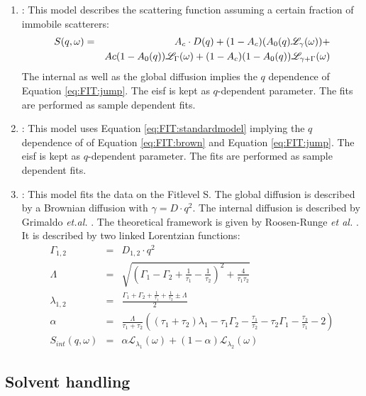 \begin{enumerate}
	\item {}: This model describes the scattering function assuming a certain fraction of immobile scatterers:
		\begin{eqnarray}
		S(q,\omega)&=&A_c\cdot D(q) +(1-A_c)(A_0(q)\mathscr{L}_\gamma(\omega))+\notag\\
		&&Ac(1-A_0(q))\mathscr{L}_{\Gamma}(\omega)+(1-A_c)(1-A_0(q))\mathscr{L}_{\gamma+\Gamma}(\omega)\label{eq:FIT:crystalmodel}
		\end{eqnarray}
	The internal as well as the global diffusion implies the $q$ dependence of Equation \ref{eq:FIT:jump}. The \gls{eisf} is kept as $q$-dependent parameter. The fits are performed as sample dependent fits.  \cite{Beck_2019_CrystGrowthDes}
	\item {}: This model uses Equation \ref{eq:FIT:standardmodel} implying the $q$ dependence of of Equation \ref{eq:FIT:brown} and Equation \ref{eq:FIT:jump}. The \gls{eisf} is kept as $q$-dependent parameter. The fits are performed as sample dependent fits. 
	\item {}: This model fits the data on the Fitlevel S. The global diffusion is described by a Brownian diffusion with $\gamma=D\cdot q^2$. The internal diffusion is described by Grimaldo \textit{et.al.} \cite{Grimaldo_2015_PhysChemChemPhys}. The theoretical framework is given by Roosen-Runge \textit{et al.} \cite{Roosen-Runge2016}. It is described by two linked Lorentzian functions:
	\begin{eqnarray}
		\Gamma_{1,2}&=&D_{1,2}\cdot q^2\\
		\Lambda&=&\sqrt{\left(\Gamma_1-\Gamma_2+\frac{1}{\tau_1}-\frac{1}{\tau_2}\right)^2+\frac{4}{\tau_1\tau_2}}\\
		\lambda_{1,2}&=&\frac{\Gamma_1+\Gamma_2+\frac{1}{\tau_1}+\frac{1}{\tau_2}\pm\Lambda}{2}\\
		\alpha&=&\frac{\Lambda}{\tau_1+\tau_2}\left((\tau_1+\tau_2)\lambda_1-\tau_1\Gamma_2-\frac{\tau_1}{\tau_2}-\tau_2\Gamma_1-\frac{\tau_2}{\tau_1}-2\right)\\
		S_{int}(q,\omega)&=&\alpha\mathscr{L}_{\lambda_1}(\omega)+(1-\alpha)\mathscr{L}_{\lambda_2}(\omega)
	\end{eqnarray}	
\end{enumerate}	
\subsection{Solvent handling}
